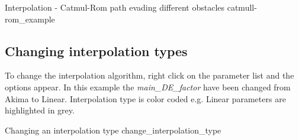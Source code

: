 {Interpolation - Catmul-Rom path evading different obstacles}
{catmull-rom_example}

\subsection{Changing interpolation types}\label{changing-interpolation-types}

To change the interpolation algorithm, right click on the parameter list and the
options appear. In this example the \emph{main\_DE\_factor} have been
changed from Akima to Linear. Interpolation type is color coded e.g. Linear
parameters are highlighted in grey.

{Changing an interpolation type}
{change_interpolation_type}
